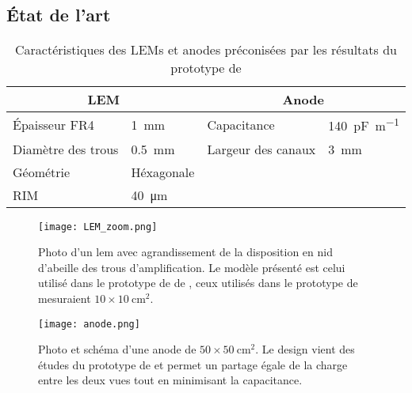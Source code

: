     \subsection{État de l'art}

      \begin{table}[]
        \centering
        \begin{tabular}{|ll||ll|}
          \hline
          \multicolumn{2}{|c||}{LEM} & \multicolumn{2}{c|}{Anode} \\ \hline \hline
          Épaisseur FR4 & \SI{1}{\milli\meter} & Capacitance & \SI{140}{\pico\farad\per\meter} \\
          Diamètre des trous & \SI{0.5}{\milli\meter} & Largeur des canaux & \SI{3}{\milli\meter} \\
          Géométrie & Héxagonale &  &  \\
          RIM & \SI{40}{\micro\meter} &  &  \\ \hline
        \end{tabular}
        \caption[Caractéristiques des LEMs et anodes utilisé dans le \threeL{}]{\label{tab::lem_anode}Caractéristiques des LEMs et anodes préconisées par les résultats du prototype de \threeL{}}
      \end{table}

      \begin{figure}[htbp]
        \begin{center}\texttt{[image: LEM\_zoom.png]}\end{center}
        \caption[Photo d'un amplificateur d'électron.]{Photo d'un \gls{lem} avec agrandissement de la disposition en nid d'abeille des trous d'amplification. Le modèle présenté est celui utilisé dans le prototype de \TOO{} de \protodp{}, ceux utilisés dans le prototype de \threeL{} mesuraient $10\times\SI{10}{\centi\meter\squared}$.}
        \label{fig::lem}
      \end{figure}

      \begin{figure}[htbp]
        \begin{center}\texttt{[image: anode.png]}\end{center}
        \caption[Photo et schéma d'une anode.]{Photo et schéma d'une anode de $50\times\SI{50}{\centi\meter\squared}$. Le design vient des études du prototype de \threeL{}\cite{Wu2017,Cantini2013} et permet un partage égale de la charge entre les deux vues tout en minimisant la capacitance.}
        \label{fig::anode}
      \end{figure}

